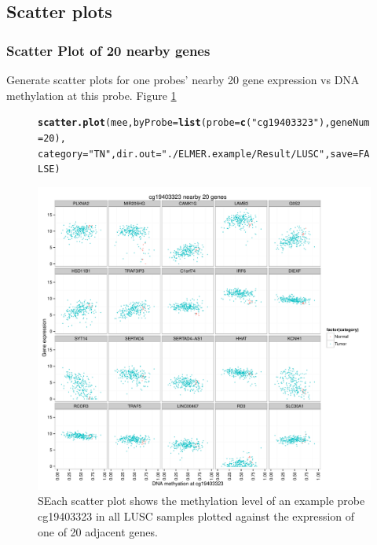 \documentclass{article}\usepackage[]{graphicx}\usepackage[usenames,dvipsnames]{color}
\makeatletter
\def\maxwidth{ %
  \ifdim\Gin@nat@width>\linewidth
    \linewidth
  \else
    \Gin@nat@width
  \fi
}
\newcommand{\hlnum}[1]{\textcolor[rgb]{0.686,0.059,0.569}{#1}}%
\newcommand{\hlstr}[1]{\textcolor[rgb]{0.192,0.494,0.8}{#1}}%
\newcommand{\hlstd}[1]{\textcolor[rgb]{0.345,0.345,0.345}{#1}}%
\newcommand{\hlkwc}[1]{\textcolor[rgb]{0.333,0.667,0.333}{#1}}%
\newcommand{\hlkwd}[1]{\textcolor[rgb]{0.737,0.353,0.396}{\textbf{#1}}}%
\newenvironment{kframe}{%
 \def\at@end@of@kframe{}%
 \ifinner\ifhmode%
  \def\at@end@of@kframe{\end{minipage}}%
  \begin{minipage}{\columnwidth}%
 \fi\fi%
 \def\FrameCommand##1{\hskip\@totalleftmargin \hskip-\fboxsep
 \colorbox{shadecolor}{##1}\hskip-\fboxsep
     \hskip-\linewidth \hskip-\@totalleftmargin \hskip\columnwidth}%
 \MakeFramed {\advance\hsize-\width
   \@totalleftmargin\z@ \linewidth\hsize
   \@setminipage}}%
 {\par\unskip\endMakeFramed%
 \at@end@of@kframe}
\newenvironment{knitrout}{}{} %
\makeatother
\begin{document}
\subsection{Scatter plots}
\subsubsection{Scatter Plot of 20 nearby genes}
Generate scatter plots for one probes' nearby 20 gene expression vs DNA methylation at this probe. Figure \ref{fig:figure1}

\begin{figure}[H]
\begin{knitrout}
\color{fgcolor}\begin{kframe}
\begin{alltt}
\hlkwd{scatter.plot}\hlstd{(mee,}\hlkwc{byProbe}\hlstd{=}\hlkwd{list}\hlstd{(}\hlkwc{probe}\hlstd{=}\hlkwd{c}\hlstd{(}\hlstr{"cg19403323"}\hlstd{),}\hlkwc{geneNum}\hlstd{=}\hlnum{20}\hlstd{),}
             \hlkwc{category}\hlstd{=}\hlstr{"TN"}\hlstd{,} \hlkwc{dir.out} \hlstd{=}\hlstr{"./ELMER.example/Result/LUSC"}\hlstd{,} \hlkwc{save}\hlstd{=}\hlnum{FALSE}\hlstd{)}
\end{alltt}


{\ttfamily\noindent\itshape\color{messagecolor}{\#\# cg19403323}}\end{kframe}

{\centering \includegraphics[width=\maxwidth]{figure/figure1-1} 

}



\end{knitrout}
\protect\caption{SEach scatter plot shows the methylation level of an example 
probe cg19403323 in all LUSC samples plotted against the expression of one of 
20 adjacent genes.
\label{fig:figure1}}
\end{figure}
\end{document}
